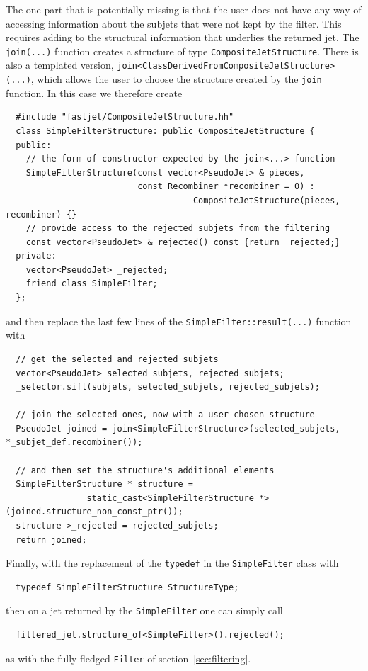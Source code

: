 \documentclass[12pt,a4]{article}
\newcommand{\ttt}[1]{{\small\texttt{#1}}}
\begin{document}
%
The one part that is potentially missing is that the user does not
have any way of accessing information about the subjets that were not
kept by the filter.
%
This requires adding to the structural information that underlies the
returned jet.
%
The \ttt{join(...)}  function creates a structure of type
\ttt{CompositeJetStructure}. There is also a templated version,
\ttt{join<ClassDerivedFromCompositeJetStructure>(...)}, which allows
the user to choose the structure created by the \ttt{join} function.
%
In this case we therefore create 
\begin{lstlisting}
  #include "fastjet/CompositeJetStructure.hh"
  class SimpleFilterStructure: public CompositeJetStructure { 
  public:
    // the form of constructor expected by the join<...> function
    SimpleFilterStructure(const vector<PseudoJet> & pieces, 
                          const Recombiner *recombiner = 0) :
                                     CompositeJetStructure(pieces, recombiner) {}
    // provide access to the rejected subjets from the filtering
    const vector<PseudoJet> & rejected() const {return _rejected;}
  private: 
    vector<PseudoJet> _rejected; 
    friend class SimpleFilter;
  };
\end{lstlisting}
and then replace the last few lines of the
\ttt{SimpleFilter::result(...)} function with
\begin{lstlisting}
  // get the selected and rejected subjets
  vector<PseudoJet> selected_subjets, rejected_subjets;
  _selector.sift(subjets, selected_subjets, rejected_subjets);

  // join the selected ones, now with a user-chosen structure
  PseudoJet joined = join<SimpleFilterStructure>(selected_subjets, *_subjet_def.recombiner());

  // and then set the structure's additional elements
  SimpleFilterStructure * structure = 
        	    static_cast<SimpleFilterStructure *>(joined.structure_non_const_ptr());
  structure->_rejected = rejected_subjets;
  return joined;
\end{lstlisting}
Finally, with the replacement of the \ttt{typedef} in the
\ttt{SimpleFilter} class with
\begin{lstlisting}
  typedef SimpleFilterStructure StructureType;
\end{lstlisting}
then on a jet returned by the \ttt{SimpleFilter} one can simply call
\begin{lstlisting}
  filtered_jet.structure_of<SimpleFilter>().rejected();
\end{lstlisting}
as with the fully fledged \ttt{Filter} of section~\ref{sec:filtering}.
\end{document}
